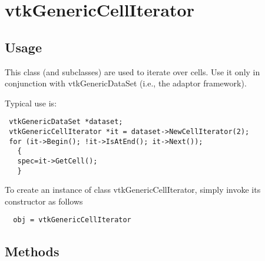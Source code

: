 \section{vtkGenericCellIterator}

\subsection{Usage}

 This class (and subclasses) are used to iterate over cells. Use it
 only in conjunction with vtkGenericDataSet (i.e., the adaptor framework).

 Typical use is:
 \begin{verbatim}
 vtkGenericDataSet *dataset;
 vtkGenericCellIterator *it = dataset->NewCellIterator(2);
 for (it->Begin(); !it->IsAtEnd(); it->Next());
   {
   spec=it->GetCell();
   }
 \end{verbatim}

To create an instance of class vtkGenericCellIterator, simply
invoke its constructor as follows
\begin{verbatim}
  obj = vtkGenericCellIterator
\end{verbatim}
\subsection{Methods}

